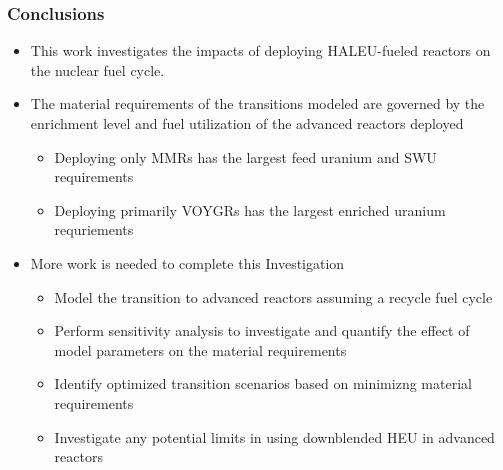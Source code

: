 \begin{frame}
      \frametitle{Conclusions}
      \begin{itemize}
        \item This work investigates the impacts of deploying \gls{HALEU}-fueled 
              reactors on the nuclear fuel cycle.
        \item The material requirements of the transitions modeled are governed 
              by the enrichment level and fuel utilization of the advanced 
              reactors deployed
            \begin{itemize}
              \item Deploying only \glspl{MMR} has the largest feed uranium and
                    \gls{SWU} requirements
              \item Deploying primarily VOYGRs has the largest enriched uranium 
                    requriements
            \end{itemize}
        \item More work is needed to complete this Investigation
        \begin{itemize}
            \item Model the transition to advanced reactors assuming a recycle fuel cycle
            \item Perform sensitivity analysis to investigate and quantify the effect 
                  of model parameters on the material requirements
            \item Identify optimized transition scenarios based on minimizng material 
                  requirements
            \item Investigate any potential limits in using downblended \gls{HEU} 
                  in advanced reactors
        \end{itemize}
      \end{itemize}
\end{frame}
